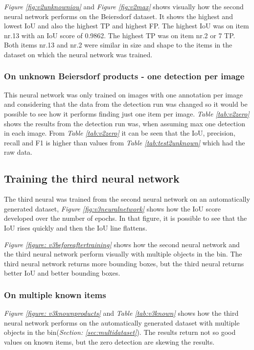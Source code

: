 \textit{Figure \ref{fig:v2unknowniou}} and \textit{Figure \ref{fig:v2max}} shows visually how the second neural network performs on the Beiersdorf dataset. It shows the highest and lowest IoU and also the highest TP and highest FP. The highest IoU was on item nr.13 with an IoU score of 0.9862. The highest TP was on item nr.2 or 7 TP. Both items nr.13 and nr.2 were similar in size and shape to the items in the dataset on which the neural network was trained.

\subsubsection{On unknown Beiersdorf products - one detection per image}
This neural network was only trained on images with one annotation per image and considering that the data from the detection run was changed so it would be possible to see how it performs finding just one item per image. \textit{Table \ref{tab:v2zero}} shows the results from the detection run was, when assuming max one detection in each image. From \textit{Table \ref{tab:v2zero}} it can be seen that the IoU, precision, recall and F1 is higher than values from \textit{Table \ref{tab:test2unknown}} which had the raw data.


\subsection{Training the third neural network}
The third neural was trained from the second neural network on an automatically generated dataset, \textit{Figure \ref{fig:v3neuralnetwork}} shows how the IoU score developed over the number of epochs. In that figure, it is possible to see that the IoU rises quickly and then the IoU line flattens.

\textit{Figure \ref{figure: v3beforeaftertraining}} shows how the second neural network and the third neural network perform visually with multiple objects in the bin. The third neural network returns more bounding boxes, but the third neural returns better IoU and better bounding boxes.

\subsubsection{On multiple known items}
\textit{Figure \ref{figure: v3knownproducts}} and \textit{Table \ref{tab:v3known}} shows how the third neural network performs on the automatically generated dataset with multiple objects in the bin(\textit{Section: \ref{sec:multidataset}}). The results return not so good values on known items, but the zero detection are skewing the results.

